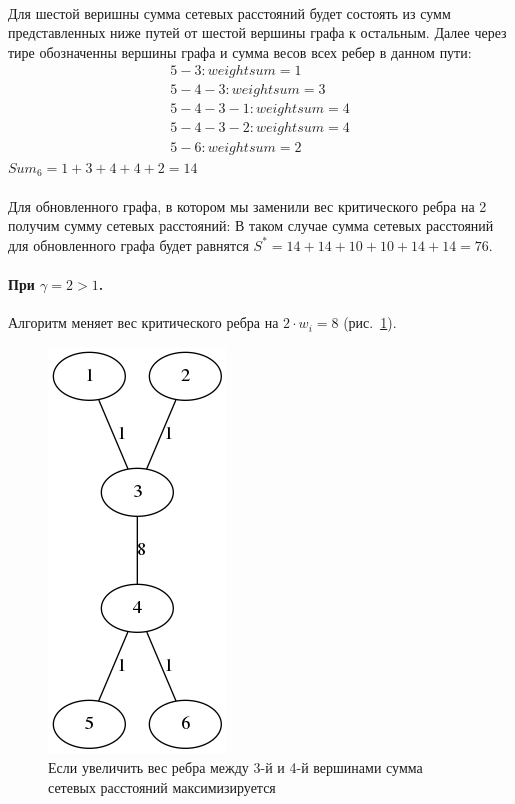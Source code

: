 \documentclass[12pt]{article}
\begin{document}
\paragraph{}

Для шестой веришны сумма сетевых расстояний будет состоять из сумм представленных ниже 
путей от шестой вершины графа к остальным.
Далее через тире обозначенны вершины графа и сумма весов всех ребер в данном пути:
\begin{gather}
5 - 3 : weight sum = 1 \\
5 - 4 - 3 : weight sum = 3 \\
5 - 4 - 3 - 1 : weight sum = 4 \\
5 - 4 - 3 - 2 : weight sum = 4 \\
5 - 6 : weight sum = 2
\end{gather}
$Sum_6 = 1 + 3 + 4 + 4 + 2 = 14$

\paragraph{}

Для обновленного графа, в котором мы заменили вес критического ребра на 2 получим сумму сетевых расстояний:
В таком случае сумма сетевых расстояний для обновленного графа будет равнятся $S^* = 14 + 14 + 10 + 10 + 14 + 14 = 76$.

\paragraph{При $\gamma = 2 > 1$.}
Алгоритм меняет вес критического ребра на $2 \cdot w_i = 8$ (рис.~\ref{fig:min_graph_8}).

\begin{figure}[h]
    \centering
    \includegraphics[scale=0.7]{min_graph_8.png}
    \caption{Если увеличить вес ребра между 3-й и 4-й вершинами сумма сетевых расстояний максимизируется}
    \label{fig:min_graph_8}
\end{figure}
\end{document}
